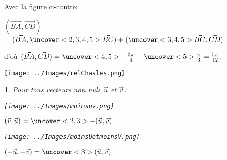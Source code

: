 \documentclass{beamer}
\newtheorem{proposition}[theorem]{\translate{Proposition}}
\theoremstyle{plain}
\begin{document}
 \begin{frame}

 \begin{example}
 \begin{multicols}{2} 
 
  Avec la figure ci-contre:   
  
   $(\vec{BA},\vec{CD})$
   $=(\vec{BA},\uncover<2,3,4,5>{\vec{BC}})+(\uncover<3,4,5>{\vec{BC}},\vec{CD})$
   
   d'où $(\vec{BA},\vec{CD})=\uncover<4,5>{-\frac{3\pi}{4}}+\uncover<5>{\frac{\pi}{3}}=\frac{5\pi}{12}$.
   
   \columnbreak 
   \texttt{[image: ../Images/relChasles.png]}
  \end{multicols}

 \end{example}
 \end{frame}
 
 \begin{frame}
  
  \begin{proposition}
 Pour tous vecteurs non nuls $\vec{u}$ et $\vec{v}$:
 \begin{multicols}{2}
  
  
  \begin{center}
    \texttt{[image: ../Images/moinsuv.png]}
    
    $(\vec{v},\vec{u})=\uncover<2,3>{-(\vec{u},\vec{v})}$
  \end{center}
 
  
  \columnbreak 
  
  
  \begin{center}
    \texttt{[image: ../Images/moinsUetmoinsV.png]}
    
    $(-\vec{u},-\vec{v})=\uncover<3>{(\vec{u},\vec{v})}$
  \end{center}

  
  \end{multicols}
  

  
\end{proposition}

\end{frame}
\end{document}
